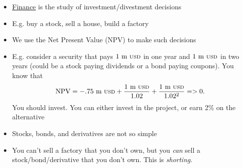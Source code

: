 \documentclass{beamer}
\begin{document}
\begin{frame}{}
	\begin{itemize}
		\item \underline{Finance} is the study of investment/divestment decisions
		\item E.g. buy a stock, sell a house, build a factory
		\item We use the Net Present Value (NPV) to make such decisions 
		\item E.g. consider a security that pays $1\text{ m {\scriptsize USD}}$ in one year and $1\text{ m {\scriptsize USD}}$ in two years (could be a stock paying dividends or a bond paying coupons). You know that 
		\begin{equation}
			\text{NPV}=-.75\text{ m {\scriptsize USD}}+\frac{1\text{ m {\scriptsize USD}}}{1.02} + \frac{1\text{ m {\scriptsize USD}}}{1.02^{2}}=>0.
		\end{equation}
		You should invest. You can either invest in the project, or earn 2\% on the alternative 
		\item Stocks, bonds, and derivatives are not so simple
	\end{itemize}
\end{frame}

\begin{frame}{}
	\begin{itemize}
		\item You can't sell a factory that you don't own, but you \textit{can} sell a stock/bond/derivative that you don't own. This is \textit{shorting}.
	\end{itemize}
\end{frame}

\begin{frame}{}

\end{frame}

\begin{frame}{}

\end{frame}

\begin{frame}{}

\end{frame}

\begin{frame}{}

\end{frame}
\end{document}
